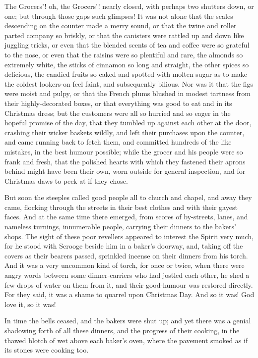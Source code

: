 The Grocers'! oh, the Grocers'! nearly closed, with perhaps two shutters down,
or one; but through those gaps such glimpses! It was not alone that the scales
descending on the counter made a merry sound, or that the twine and roller
parted company so briskly, or that the canisters were rattled up and down like
juggling tricks, or even that the blended scents of tea and coffee were so
grateful to the nose, or even that the raisins were so plentiful and rare, the
almonds so extremely white, the sticks of cinnamon so long and straight, the
other spices so delicious, the candied fruits so caked and spotted with molten
sugar as to make the coldest lookers-on feel faint, and subsequently bilious.
Nor was it that the figs were moist and pulpy, or that the French plums blushed
in modest tartness from their highly-decorated boxes, or that every\-thing was
good to eat and in its Christmas dress; but the customers were all so hurried
and so eager in the hopeful promise of the day, that they tumbled up against
each other at the door, crashing their wicker baskets wildly, and left their
purchases upon the counter, and came running back to fetch them, and committed
hundreds of the like mistakes, in the best humour possible; while the grocer and
his people were so frank and fresh, that the polished hearts with which they
fastened their aprons behind might have been their own, worn outside for general
inspection, and for Christmas daws to peck at if they chose.

But soon the steeples called good people all to church and chap\-el, and away
they came, flocking through the streets in their best clothes and with their
gayest faces. And at the same time there emerged, from scores of by-streets,
lanes, and nameless turnings, innumerable people, carrying their dinners to the
bakers' shops. The sight of these poor revellers appeared to interest the Spirit
very much, for he stood with Scrooge beside him in a baker's doorway, and,
taking off the covers as their bearers passed, sprin\-kled incense on their
dinners from his torch. And it was a very uncommon kind of torch, for once or
twice, when there were angry words between some dinner-carriers who had jostled
each other, he shed a few drops of water on them from it, and their good-humour
was restored directly. For they said, it was a shame to quarrel upon Christmas
Day. And so it was! God love it, so it was!

In time the bells ceased, and the bakers were shut up; and yet there was a
genial shadowing forth of all these dinners, and the progress of their cooking,
in the thawed blotch of wet above each baker's oven, where the pavement smoked
as if its stones were cooking too.

